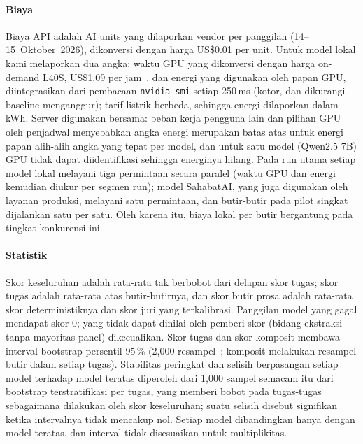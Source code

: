 \paragraph{Biaya} Biaya API adalah AI units yang dilaporkan vendor per panggilan (14--15~Oktober~2026), dikonversi dengan harga US\$0.01 per unit. Untuk model lokal kami melaporkan dua angka: waktu GPU yang dikonversi dengan harga on-demand L40S, US\$1.09 per jam~\cite{runpodl40s}, dan energi yang digunakan oleh papan GPU, diintegrasikan dari pembacaan \texttt{nvidia-smi} setiap 250\,ms (kotor, dan dikurangi baseline menganggur); tarif listrik berbeda, sehingga energi dilaporkan dalam kWh. Server digunakan bersama: beban kerja pengguna lain dan pilihan GPU oleh penjadwal menyebabkan angka energi merupakan batas atas untuk energi papan alih-alih angka yang tepat per model, dan untuk satu model (Qwen2.5 7B) GPU tidak dapat diidentifikasi sehingga energinya hilang. Pada run utama setiap model lokal melayani tiga permintaan secara paralel (waktu GPU dan energi kemudian diukur per segmen run); model SahabatAI, yang juga digunakan oleh layanan produksi, melayani satu permintaan, dan butir-butir pada pilot singkat dijalankan satu per satu. Oleh karena itu, biaya lokal per butir bergantung pada tingkat konkurensi ini.

\paragraph{Statistik} Skor keseluruhan adalah rata-rata tak berbobot dari delapan skor tugas; skor tugas adalah rata-rata atas butir-butirnya, dan skor butir prosa adalah rata-rata skor deterministiknya dan skor juri yang terkalibrasi. Panggilan model yang gagal mendapat skor 0; yang tidak dapat dinilai oleh pemberi skor (bidang ekstraksi tanpa mayoritas panel) dikecualikan. Skor tugas dan skor komposit membawa interval bootstrap persentil 95\,\% (2{,}000 resampel~\cite{efron1979bootstrap}; komposit melakukan resampel butir dalam setiap tugas). Stabilitas peringkat dan selisih berpasangan setiap model terhadap model teratas diperoleh dari 1{,}000 sampel semacam itu dari bootstrap terstratifikasi per tugas, yang memberi bobot pada tugas-tugas sebagaimana dilakukan oleh skor keseluruhan; suatu selisih disebut signifikan ketika intervalnya tidak mencakup nol. Setiap model dibandingkan hanya dengan model teratas, dan interval tidak disesuaikan untuk multiplikitas.
